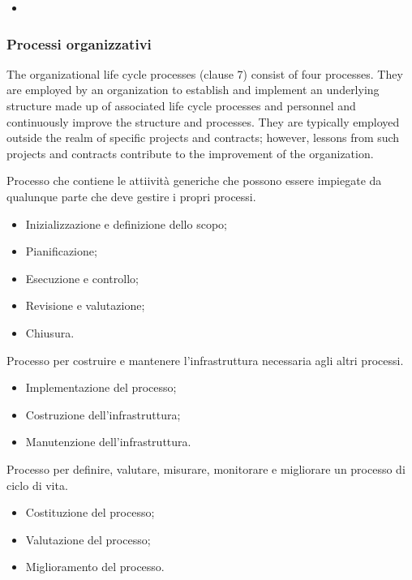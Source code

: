 \begin{itemize}
    \item 
\end{itemize}

\subsubsection{Processi organizzativi}
The organizational life cycle processes (clause 7) consist of four processes. They are employed by an
organization to establish and implement an underlying structure made up of associated life cycle
processes and personnel and continuously improve the structure and processes. They are typically
employed outside the realm of specific projects and contracts; however, lessons from such projects and
contracts contribute to the improvement of the organization.

Processo che contiene le attiività generiche che possono 
essere impiegate da qualunque parte che deve gestire i propri processi.
\begin{itemize}
    \item Inizializzazione e definizione dello scopo;
    \item Pianificazione;
    \item Esecuzione e controllo;
    \item Revisione e valutazione;
    \item Chiusura.
\end{itemize}

Processo per costruire e mantenere l'infrastruttura necessaria
agli altri processi.
\begin{itemize}
    \item Implementazione del processo;
    \item Costruzione dell'infrastruttura;
    \item Manutenzione dell'infrastruttura.
\end{itemize}

Processo per definire, valutare, misurare, monitorare e migliorare
un processo di ciclo di vita.
\begin{itemize}
    \item Costituzione del processo;
    \item Valutazione del processo;
    \item Miglioramento del processo.
\end{itemize}

